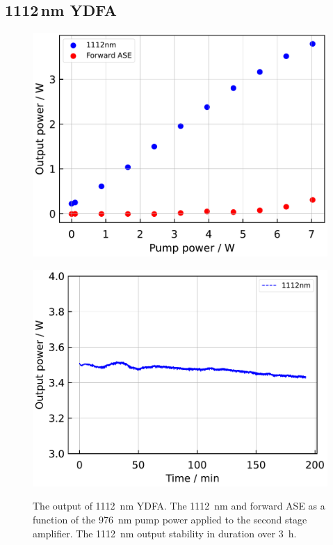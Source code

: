 \documentclass{osa-article}
\begin{document}
\subsection{1112\,nm YDFA}
\begin{figure}[h]
  \begin{minipage}[b]{0.5\linewidth}
    \centering
    \includegraphics[keepaspectratio, width=0.9\linewidth]{./Figure/1112nmYDFA2ndStageOutput_Exp.pdf}
    \subcaption{}
    \label{fig:OutputOf1112YDFA}
  \end{minipage}
  \begin{minipage}[b]{0.5\linewidth}
    \centering
    \includegraphics[keepaspectratio, width=0.9\linewidth]{./Figure/1112nmYDFA2ndStageOutputStability.pdf}
    \subcaption{}
    \label{fig:StabilityOf1112YDFA}
  \end{minipage}
  \caption{The output of \SI{1112}{\nm} YDFA.  The \SI{1112}{nm} and forward ASE as a function of the \SI{976}{\nm} pump power applied to the second stage amplifier.  The \SI{1112}{\nm} output stability in duration over \SI{3}{\hour}.}
\end{figure}
\end{document}
